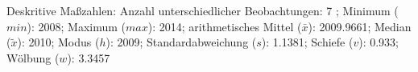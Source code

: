                     \begin{noten}
                	    \note{} Deskritive Maßzahlen:
                	    Anzahl unterschiedlicher Beobachtungen: 7%
                	    ; 
                	      Minimum ($min$): 2008; 
                	      Maximum ($max$): 2014; 
                	      arithmetisches Mittel ($\bar{x}$): \num[round-mode=places,round-precision=2]{2009,9661}; 
                	      Median ($\tilde{x}$): 2010; 
                	      Modus ($h$): 2009; 
                	      Standardabweichung ($s$): \num[round-mode=places,round-precision=2]{1,1381}; 
                	      Schiefe ($v$): \num[round-mode=places,round-precision=2]{0,933}; 
                	      Wölbung ($w$): \num[round-mode=places,round-precision=2]{3,3457}
                     \end{noten}


